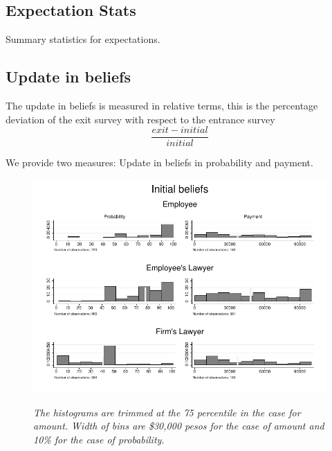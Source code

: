 \documentclass[12pt]{article}
\theoremstyle{named}
\newcommand{\folder}{./Effect}
\begin{document}
\subsection*{Expectation Stats}

Summary statistics for expectations.

\begin{center}
\scriptsize{}
\end{center}

\pagebreak

\subsection*{Update in beliefs}

The update in beliefs is measured in relative terms, this is the percentage deviation of the exit survey with respect to the entrance survey
\[\frac{exit-initial}{initial}\]

We provide two measures: Update in beliefs in probability and payment.\\

\begin{center}
\scriptsize{}
\end{center}

\begin{figure}[H]
\label{diff}
\begin{center}
\includegraphics[width=\textwidth]{./Figures/belief.pdf}
\end{center}
{\footnotesize \textit{The histograms are trimmed at the 75 percentile in the case for amount. Width of bins are \$30,000 pesos for the case of amount and 10\% for the case of probability.}}
\end{figure}
\end{document}
